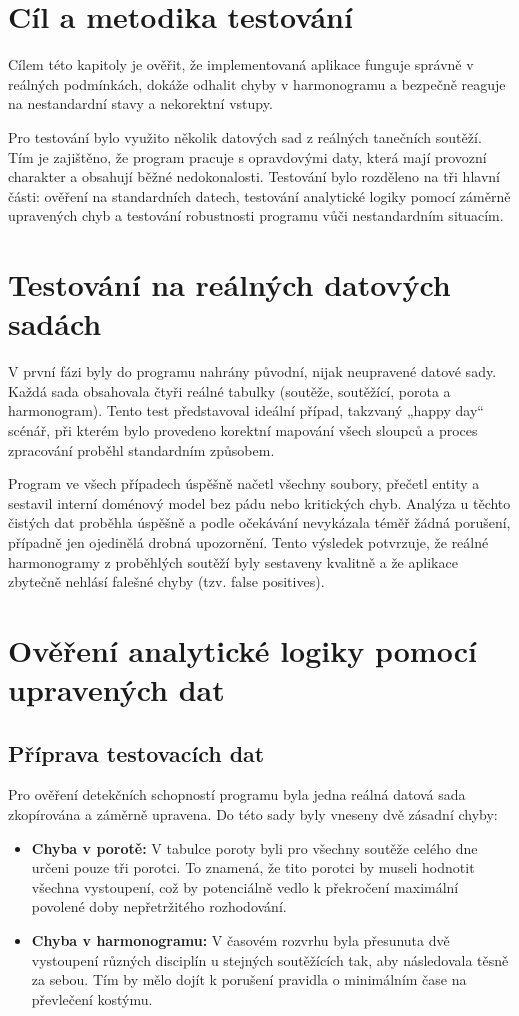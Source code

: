 \documentclass[czech, kiv, ba, he, iso690alph, pdf]{fasthesis}
\begin{document}
		\section{Cíl a metodika testování}
			Cílem této kapitoly je ověřit, že implementovaná aplikace funguje správně v reálných podmínkách, dokáže odhalit chyby v harmonogramu a bezpečně reaguje na nestandardní stavy a nekorektní vstupy. 

			Pro testování bylo využito několik datových sad z reálných tanečních soutěží. Tím je zajištěno, že program pracuje s opravdovými daty, která mají provozní charakter a obsahují běžné nedokonalosti. Testování bylo rozděleno na tři hlavní části: ověření na standardních datech, testování analytické logiky pomocí záměrně upravených chyb a testování robustnosti programu vůči nestandardním situacím.

		\section{Testování na reálných datových sadách}
			V první fázi byly do programu nahrány původní, nijak neupravené datové sady. Každá sada obsahovala čtyři reálné tabulky (soutěže, soutěžící, porota a harmonogram). Tento test představoval ideální případ, takzvaný „happy day“ scénář, při kterém bylo provedeno korektní mapování všech sloupců a proces zpracování proběhl standardním způsobem.

			Program ve všech případech úspěšně načetl všechny soubory, přečetl entity a sestavil interní doménový model bez pádu nebo kritických chyb. Analýza u těchto čistých dat proběhla úspěšně a podle očekávání nevykázala téměř žádná porušení, případně jen ojedinělá drobná upozornění. Tento výsledek potvrzuje, že reálné harmonogramy z proběhlých soutěží byly sestaveny kvalitně a že aplikace zbytečně nehlásí falešné chyby (tzv. false positives).

		\section{Ověření analytické logiky pomocí upravených dat}

			\subsection{Příprava testovacích dat}
				Pro ověření detekčních schopností programu byla jedna reálná datová sada zkopírována a záměrně upravena. Do této sady byly vneseny dvě zásadní chyby:
				\begin{itemize}
					\item \textbf{Chyba v porotě:} V tabulce poroty byli pro všechny soutěže celého dne určeni pouze tři porotci. To znamená, že tito porotci by museli hodnotit všechna vystoupení, což by potenciálně vedlo k překročení maximální povolené doby nepřetržitého rozhodování.
					\item \textbf{Chyba v harmonogramu:} V časovém rozvrhu byla přesunuta dvě vystoupení různých disciplín u stejných soutěžících tak, aby následovala těsně za sebou. Tím by mělo dojít k porušení pravidla o minimálním čase na převlečení kostýmu.
				\end{itemize}
\end{document}
